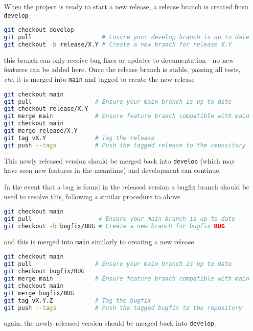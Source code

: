 \documentclass[11pt]{article}
\begin{document}
When the project is ready to start a new release, a release branch is created from \texttt{develop}
\begin{lstlisting}[language=sh, basicstyle=\fontsize{9}{10}\ttfamily\label{lst:release-branch}]
git checkout develop
git pull                    # Ensure your develop branch is up to date
git checkout -b release/X.Y # Create a new branch for release X.Y
\end{lstlisting}
this branch can only receive bug fixes or updates to documentation - no new features can be added
here.
Once the release branch is stable, passing all tests, \textit{etc.} it is merged into \texttt{main}
and tagged to create the new release
\begin{lstlisting}[language=sh, basicstyle=\fontsize{9}{10}\ttfamily\label{lst:release-merge}]
git checkout main
git pull                  # Ensure your main branch is up to date
git checkout release/X.Y
git merge main            # Ensure feature branch compatible with main
git checkout main
git merge release/X.Y
git tag vX.Y              # Tag the release
git push --tags           # Push the tagged release to the repository
\end{lstlisting}
This newly released version should be merged back into \texttt{develop} (which may have seen new
features in the meantime) and development can continue.

In the event that a bug is found in the released version a bugfix branch should be used to resolve
this, following a similar procedure to above
\begin{lstlisting}[language=sh, basicstyle=\fontsize{9}{10}\ttfamily\label{lst:bugfix-branch}]
git checkout main
git pull                   # Ensure your main branch is up to date
git checkout -b bugfix/BUG # Create a new branch for bugfix BUG
\end{lstlisting}
and this is merged into \texttt{main} similarly to creating a new release
\begin{lstlisting}[language=sh, basicstyle=\fontsize{9}{10}\ttfamily\label{lst:release-merge}]
git checkout main
git pull                  # Ensure your main branch is up to date
git checkout bugfix/BUG
git merge main            # Ensure feature branch compatible with main
git checkout main
git merge bugfix/BUG
git tag vX.Y.Z            # Tag the bugfix
git push --tags           # Push the tagged bugfix to the repository
\end{lstlisting}
again, the newly released version should be merged back into \texttt{develop}.
\end{document}
